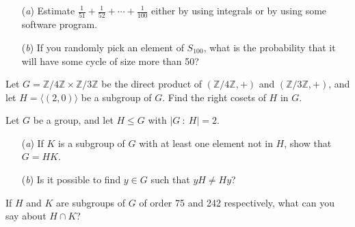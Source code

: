 \documentclass[12pt,letterpaper,boxed]{hmcpset}
\begin{document}

\begin{problem}[3.3.4]
\begin{itemize}
  \item[(\textit{a})] Estimate $ \frac{1}{51} + \frac{1}{52} + \cdots + \frac{1}{100} $ either by using integrals or by using some software program. 
  
  \item[(\textit{b})] If you randomly pick an element of $ S_{100} $, what is the probability that it will have some cycle of size more than 50?
\end{itemize}
\end{problem}

\begin{solution}

\end{solution}

\clearpage

\begin{problem}[5.1.1]
Let $ G = \mathbb{Z}/4\mathbb{Z} \times \mathbb{Z}/3\mathbb{Z} $ be the direct product of $ (\mathbb{Z}/4\mathbb{Z}, +) $ and $ (\mathbb{Z}/3\mathbb{Z}, +) $, and let $ H = \langle (2,0) \rangle $ be a subgroup of $G$. Find the right cosets of $H$ in $G$. 
\end{problem}

\begin{solution}
\end{solution}

\clearpage

\begin{problem}[5.1.6]
Let $G$ be a group, and let $ H \leq G $ with $ \vert G \ : \ H \vert = 2 $. 
\begin{itemize}
  \item[(\textit{a})] If $K$ is a subgroup of $G$ with at least one element not in $H$, show that $G = HK$. 
  
  \item[(\textit{b})] Is it possible to find $y \in G$ such that $yH \neq Hy$? 
\end{itemize}
\end{problem}

\begin{solution}
\end{solution}

\clearpage


\begin{problem}[5.2.1]
If $H$ and $K$ are subgroups of $G$ of order 75 and 242 respectively, what can you say about $H \cap K$?
\end{problem}
\end{document}
